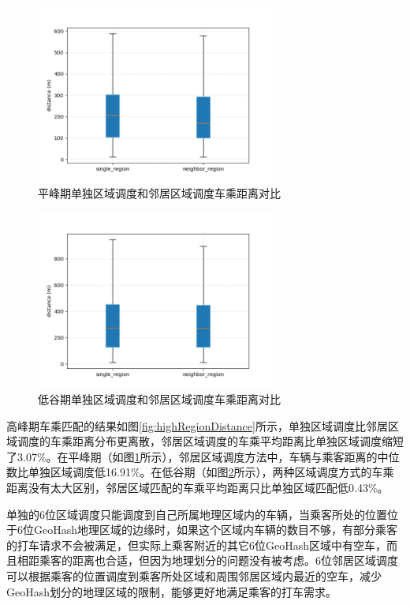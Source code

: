 \begin{figure}[h]
  \centering
  \includegraphics[height=0.3\textheight,width=0.7\textwidth]{figures/平峰车乘匹配}
  \caption{平峰期单独区域调度和邻居区域调度车乘距离对比}\label{fig:pingRegionDistance}
\end{figure}

\begin{figure}[h]
  \centering
  \includegraphics[height=0.3\textheight,width=0.7\textwidth]{figures/低谷车乘匹配}
  \caption{低谷期单独区域调度和邻居区域调度车乘距离对比}\label{fig:shaoRegionDistance}
\end{figure}

高峰期车乘匹配的结果如图\ref{fig:highRegionDistance}所示，单独区域调度比邻居区域调度的车乘距离分布更离散，邻居区域调度的车乘平均距离比单独区域调度缩短了3.07$\%$。在平峰期（如图\ref{fig:pingRegionDistance}所示），邻居区域调度方法中，车辆与乘客距离的中位数比单独区域调度低16.91$\%$。在低谷期（如图\ref{fig:shaoRegionDistance}所示），两种区域调度方式的车乘距离没有太大区别，邻居区域匹配的车乘平均距离只比单独区域匹配低0.43$\%$。

单独的6位区域调度只能调度到自己所属地理区域内的车辆，当乘客所处的位置位于6位GeoHash地理区域的边缘时，如果这个区域内车辆的数目不够，有部分乘客的打车请求不会被满足，但实际上乘客附近的其它6位GeoHash区域中有空车，而且相距乘客的距离也合适，但因为地理划分的问题没有被考虑。6位邻居区域调度可以根据乘客的位置调度到乘客所处区域和周围邻居区域内最近的空车，减少GeoHash划分的地理区域的限制，能够更好地满足乘客的打车需求。

